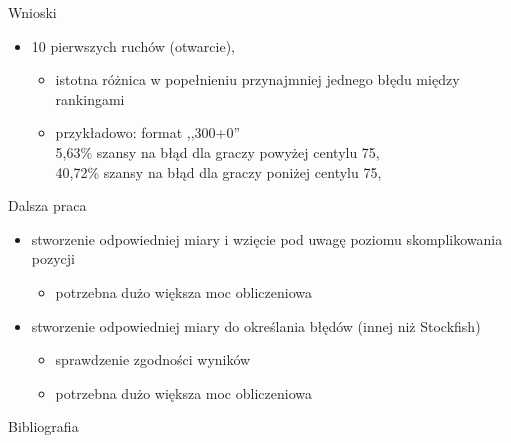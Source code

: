 \documentclass{beamer}
\begin{document}
\begin{frame}{Wnioski}
	\begin{itemize}
		\item 10 pierwszych ruchów (otwarcie), 
		\begin{itemize}
			\item istotna różnica w popełnieniu przynajmniej jednego  błędu między rankingami
			\item przykładowo: format ,,300+0''\\ 
			\phantom{4}5,63\% szansy na błąd dla graczy powyżej centylu 75, \\
			40,72\% szansy na błąd dla graczy poniżej centylu 75, \\
		\end{itemize}	
	\end{itemize}
\end{frame}


\begin{frame}{Dalsza praca}
	\begin{itemize}
		\item stworzenie odpowiedniej miary i wzięcie pod uwagę poziomu skomplikowania pozycji
		\begin{itemize}
			\item potrzebna dużo większa moc obliczeniowa	
		\end{itemize}
	
		\item stworzenie odpowiedniej miary do określania błędów (innej niż Stockfish)
		\begin{itemize}
			\item sprawdzenie zgodności wyników
			\item potrzebna dużo większa moc obliczeniowa	
		\end{itemize}
	\end{itemize}
	
\end{frame}

\begin{frame}{Bibliografia}
	 
\end{frame}
\end{document}
